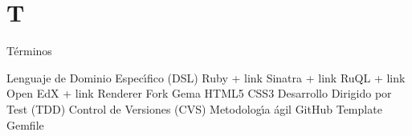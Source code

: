 \section{T}
\label{Apendice1:T}

T\'erminos
\bigskip

Lenguaje de Dominio Espec\'{\i}fico (DSL)
Ruby + link
Sinatra + link
RuQL + link
Open EdX + link
Renderer
Fork
Gema
HTML5
CSS3
Desarrollo Dirigido por Test (TDD)
Control de Versiones (CVS)
Metodolog\'{\i}a \'agil
GitHub
Template
Gemfile
